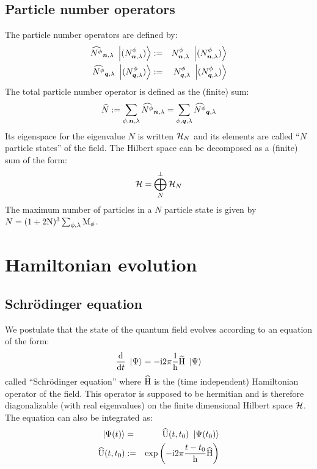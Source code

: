 \documentclass[10pt,a4paper,twoside,openany]{book}
\begin{document}
\section{Particle number operators}

 The particle number operators are defined by:
\begin{eqnarray*}
\widehat{N^{\phi}}_{{\boldsymbol{n}}, {\lambda}} \ \left|{({N}^{\phi}_{{\boldsymbol{n}}, {\lambda}})}\right\rangle & := & {N}^{\phi}_{{\boldsymbol{n}}, {\lambda}} \ \left|{({N}^{\phi}_{{\boldsymbol{n}}, {\lambda}})}\right\rangle \\
\widehat{N^{\phi}}_{{\boldsymbol{q}}, {\lambda}} \ \left|{({N}^{\phi}_{{\boldsymbol{q}}, {\lambda}})}\right\rangle & := & {N}^{\phi}_{{\boldsymbol{q}}, {\lambda}} \ \left|{({N}^{\phi}_{{\boldsymbol{q}}, {\lambda}})}\right\rangle
\end{eqnarray*}
The total particle number operator is defined as the (finite) sum:
\begin{equation*}
\widehat{N} := \sum_{\phi,\boldsymbol{n},\lambda} \widehat{N^{\phi}}_{{\boldsymbol{n}}, {\lambda}} = \sum_{\phi,\boldsymbol{q},\lambda} \widehat{N^{\phi}}_{{\boldsymbol{q}}, {\lambda}}
\end{equation*}
Its eigenspace for the eigenvalue $N$ is written $\mathcal H_{N}$ and its elements are called ``$N$ particle states'' of the field. The Hilbert space can be decomposed as a (finite) sum of the form:
\begin{equation*}
\mathcal H = \bigoplus_{N}^\perp \mathcal H_{N}
\end{equation*}
The maximum number of particles in a $N$ particle state is given by $N = (1+2 \mathrm N)^3 \sum_{\phi,\lambda} \mathrm M_{\phi}$.

\chapter{Hamiltonian evolution}
\label{Hamiltonian evolution}

\section{Schrödinger equation}
\label{Schrödinger equation}

We postulate that the state of the quantum field evolves according to an equation of the form:
\begin{equation*}
\frac{\mathrm d}{\mathrm dt} \ \left|{\Psi}\right\rangle = -\mathrm{i} 2 \pi \frac 1 {\mathrm h} \widehat{\mathrm H} \ \left|{\Psi}\right\rangle
\end{equation*}
called ``Schrödinger equation'' where $\widehat{\mathrm H}$ is the (time independent) Hamiltonian operator of the field. This operator is supposed to be hermitian and is therefore diagonalizable (with real eigenvalues) on the finite dimensional Hilbert space $\mathcal H$. The equation can also be integrated as:
\begin{eqnarray*}
\ \left|{\Psi(t)}\right\rangle & = & \widehat{\mathrm U}({t},{t_0}) \ \left|{\Psi(t_0)}\right\rangle \\
\widehat{\mathrm U}({t},{t_0}) & := & \mathrm{exp} \left( {- \mathrm{i} 2 \pi \frac{t - t_0} {\mathrm h} \widehat{\mathrm H}} \right)
\end{eqnarray*}
\end{document}
